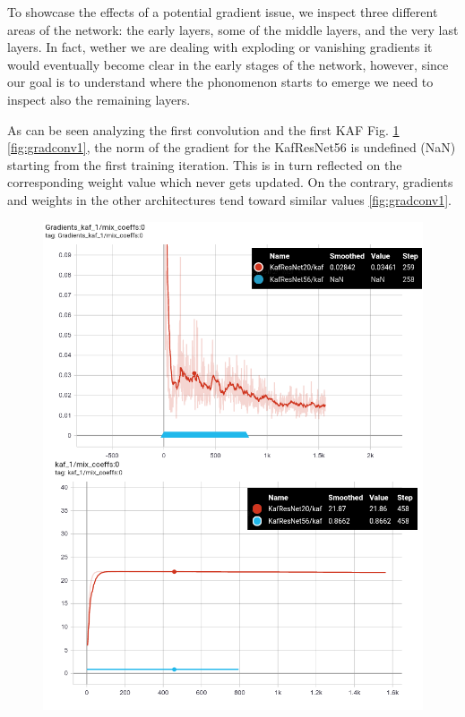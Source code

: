 \documentclass[LaM,binding=0.6cm]{./packages/sapthesis/sapthesis}
\begin{document}
        To showcase the effects of a potential gradient issue, we inspect three different areas of the network: the early layers, some of the middle layers, and the very last layers. In fact, 
        wether we are dealing with exploding or vanishing gradients it would eventually become clear in the early stages of the network, however, since our goal is to understand where the phonomenon starts to emerge
        we need to inspect also the remaining layers. 
        
        As can be seen analyzing the first convolution and the first KAF Fig. \ref{fig:gradkaf1} \ref{fig:gradconv1}, the norm of the gradient for the KafResNet56 is undefined (NaN) starting from the first training iteration.
        This is in turn reflected on the corresponding weight value which never gets updated. On the contrary, gradients and weights in the other architectures tend toward similar values \ref{fig:gradconv1}. 
        \begin{figure}[h!]
            \centering
            \includegraphics[scale=0.32]{kaf1.png}
            \caption{}
            \label{fig:gradkaf1}
        \end{figure}      
        
\end{document}
